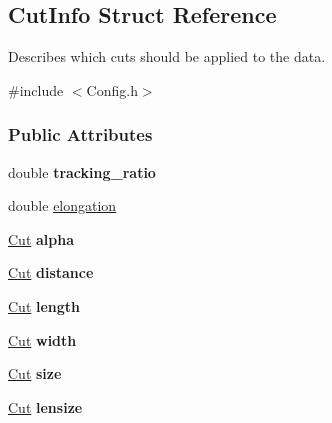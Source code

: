 \hypertarget{structCutInfo}{
\subsection{CutInfo Struct Reference}
\label{structCutInfo}
}


Describes which cuts should be applied to the data.  




{\ttfamily \#include $<$Config.h$>$}

\subsubsection*{Public Attributes}
\begin{DoxyCompactItemize}
\item 
\hypertarget{structCutInfo_a106a0ff9158531ad231e8a35f0780115}{
double {\bfseries tracking\_\-ratio}}
\label{structCutInfo_a106a0ff9158531ad231e8a35f0780115}

\item 
\hypertarget{structCutInfo_a74caf842b770af7717058c023aaab6e6}{
double \hyperlink{structCutInfo_a74caf842b770af7717058c023aaab6e6}{elongation}}
\label{structCutInfo_a74caf842b770af7717058c023aaab6e6}

\item 
\hypertarget{structCutInfo_ac11dc7dcd25917e62a1cfb54e37849b9}{
\hyperlink{structCut}{Cut} {\bfseries alpha}}
\label{structCutInfo_ac11dc7dcd25917e62a1cfb54e37849b9}

\item 
\hypertarget{structCutInfo_a6e54150661e34dd9068b04b1d13cf99a}{
\hyperlink{structCut}{Cut} {\bfseries distance}}
\label{structCutInfo_a6e54150661e34dd9068b04b1d13cf99a}

\item 
\hypertarget{structCutInfo_a64686c58c49e0a090b77d6053e8af1b5}{
\hyperlink{structCut}{Cut} {\bfseries length}}
\label{structCutInfo_a64686c58c49e0a090b77d6053e8af1b5}

\item 
\hypertarget{structCutInfo_ac71db39310190ea1db633eac8f5670d3}{
\hyperlink{structCut}{Cut} {\bfseries width}}
\label{structCutInfo_ac71db39310190ea1db633eac8f5670d3}

\item 
\hypertarget{structCutInfo_ad7c74fbec9d41def251a53d8dd3de8bd}{
\hyperlink{structCut}{Cut} {\bfseries size}}
\label{structCutInfo_ad7c74fbec9d41def251a53d8dd3de8bd}

\item 
\hypertarget{structCutInfo_a180779ebcc52ebded805398925af554f}{
\hyperlink{structCut}{Cut} {\bfseries lensize}}
\label{structCutInfo_a180779ebcc52ebded805398925af554f}


\end{DoxyCompactItemize}
